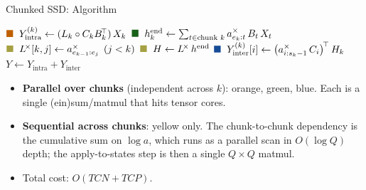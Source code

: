 \begin{frame}{Chunked SSD: Algorithm}
  \begin{center}
  \footnotesize
  \begin{algorithm}[H]
    \caption{Chunked SSD (scalar $A_t = a_t$)}
    \BlankLine
    $\textcolor{orange!75!black}{\blacksquare}\;\; Y_{\text{intra}}^{(k)} \gets (L_k \circ C_k B_k^{\!\top})\, X_k$ 
    $\textcolor{mambagreen!70!black}{\blacksquare}\;\; h_k^{\text{end}} \gets \sum_{t \in \text{chunk } k} a^\times_{e_k:t}\, B_t\, X_t$ 
    $\textcolor{yellow!60!black}{\blacksquare}\;\; L^{\!\times}[k,j] \gets a^\times_{e_{k-1}:e_j}\;\,(j < k)$ 
    $\textcolor{yellow!60!black}{\blacksquare}\;\; H \gets L^{\!\times}\, h^{\text{end}}$ 
    $\textcolor{mambablue!75!black}{\blacksquare}\;\; Y_{\text{inter}}^{(k)}[i] \gets \bigl(a^\times_{i:s_k - 1}\, C_i\bigr)^{\!\top}\, H_k$ 
    \Return $Y \gets Y_{\text{intra}} + Y_{\text{inter}}$\;
  \end{algorithm}
  \end{center}

  \vspace{0.4em}
  \begin{itemize}\itemsep1pt
    \item \textbf{Parallel over chunks} (independent across $k$): orange, green, blue. Each is a single (ein)sum/matmul that hits tensor cores.
    \item \textbf{Sequential across chunks}: yellow only. The chunk-to-chunk dependency is the cumulative sum on $\log a$, which runs as a parallel scan in $O(\log Q)$ depth; the apply-to-states step is then a single $Q{\times}Q$ matmul.
    \item Total cost: $O(TCN + TCP)$.
  \end{itemize}
\end{frame}

